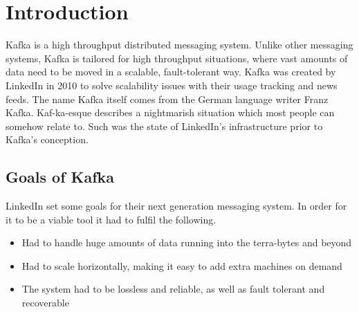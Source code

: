 \section{Introduction}

Kafka is a high throughput distributed messaging system. Unlike other messaging systems, Kafka is tailored for high throughput situations, where vast amounts of data need to be moved in a scalable, fault-tolerant way. Kafka was created by LinkedIn in 2010 to solve scalability issues with their usage tracking and news feeds. The name Kafka itself comes from the German language writer Franz Kafka. Kaf-ka-esque describes a nightmarish situation which most people can somehow relate to. Such was the state of LinkedIn's infrastructure prior to Kafka's conception.

\subsection{Goals of Kafka}

LinkedIn set some goals for their next generation messaging system. In order for it to be a viable tool it had to fulfil the following.

\begin{itemize}
  \item Had to handle huge amounts of data running into the terra-bytes and beyond
  \item Had to scale horizontally, making it easy to add extra machines on demand
  \item The system had to be lossless and reliable, as well as fault tolerant and recoverable
\end{itemize}